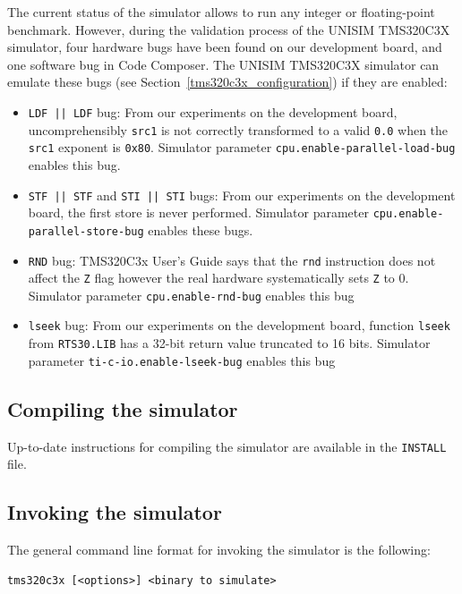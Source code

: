 The current status of the simulator allows to run any integer or floating-point benchmark.
However, during the validation process of the UNISIM TMS320C3X simulator, four hardware bugs have been found on our development board, and one software bug in Code Composer. The UNISIM TMS320C3X simulator can emulate these bugs (see Section~\ref{tms320c3x_configuration}) if they are enabled:
\begin{itemize}
\item \texttt{LDF || LDF} bug: From our experiments on the development board, uncomprehensibly \texttt{src1} is not correctly transformed to a valid \texttt{0.0} when the \texttt{src1} exponent is \texttt{0x80}. Simulator parameter \texttt{cpu.enable-parallel-load-bug} enables this bug.
\item \texttt{STF || STF} and \texttt{STI || STI} bugs: From our experiments on the development board, the first store is never performed. Simulator parameter \texttt{cpu.enable-parallel-store-bug} enables these bugs.
\item \texttt{RND} bug: TMS320C3x User’s Guide says that the \texttt{rnd} instruction does not affect the \texttt{Z} flag however the real hardware systematically sets \texttt{Z} to 0. Simulator parameter \texttt{cpu.enable-rnd-bug} enables this bug
\item \texttt{lseek} bug: From our experiments on the development board, function \texttt{lseek} from \texttt{RTS30.LIB} has a 32-bit return value truncated to 16 bits. Simulator parameter \texttt{ti-c-io.enable-lseek-bug} enables this bug
\end{itemize}

\subsection{Compiling the simulator}

Up-to-date instructions for compiling the simulator are available in the \texttt{INSTALL} file.

\subsection{Invoking the simulator}

The general command line format for invoking the simulator is the following:

\begin{verbatim}
tms320c3x [<options>] <binary to simulate>
\end{verbatim}

